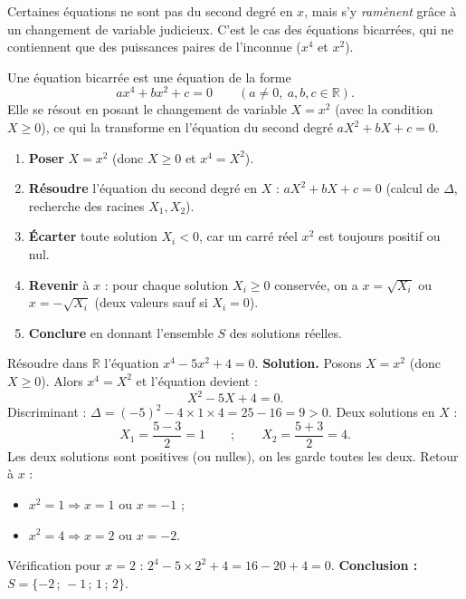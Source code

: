 \documentclass[11pt]{article}
\newcommand{\cle}[1]{{\popxbold\color{popdark}#1}}
\newcounter{popsec}
\newcounter{popsub}
\newcommand{\courssub}[1]{%
  \stepcounter{popsub}%
  \par\vspace{9pt}\noindent{\popxbold\fontsize{11.5}{13}\selectfont\color{popink}{\color{poporange}\thepopsec.\thepopsub}\hspace{6pt}#1}\par\nopagebreak\vspace{4pt}
}
\begin{document}
\courssub{Équations bicarrées}

Certaines équations ne sont pas du second degré en $x$, mais s'y \emph{ramènent} grâce à un changement de variable judicieux. C'est le cas des équations \cle{bicarrées}, qui ne contiennent que des puissances paires de l'inconnue ($x^4$ et $x^2$).

\begin{definition}
Une équation \cle{bicarrée} est une équation de la forme
\[ ax^4+bx^2+c=0 \qquad (a\neq 0,\ a,b,c\in\mathbb{R}). \]
Elle se résout en posant le changement de variable $X=x^2$ (avec la condition $X\geq 0$), ce qui la transforme en l'équation du second degré $aX^2+bX+c=0$.
\end{definition}

\begin{methode}
\begin{enumerate}
\item \textbf{Poser} $X=x^2$ (donc $X\geq 0$ et $x^4=X^2$).
\item \textbf{Résoudre} l'équation du second degré en $X$ : $aX^2+bX+c=0$ (calcul de $\Delta$, recherche des racines $X_1, X_2$).
\item \textbf{Écarter} toute solution $X_i < 0$, car un carré réel $x^2$ est toujours positif ou nul.
\item \textbf{Revenir} à $x$ : pour chaque solution $X_i \geq 0$ conservée, on a $x=\sqrt{X_i}$ ou $x=-\sqrt{X_i}$ (deux valeurs sauf si $X_i=0$).
\item \textbf{Conclure} en donnant l'ensemble $S$ des solutions réelles.
\end{enumerate}
\end{methode}

\begin{exoresolu}[Résoudre $x^4-5x^2+4=0$]
Résoudre dans $\mathbb{R}$ l'équation $x^4-5x^2+4=0$.
\tcblower
\textbf{Solution.}
Posons $X=x^2$ (donc $X\geq 0$). Alors $x^4=X^2$ et l'équation devient :
\[ X^2-5X+4=0. \]
Discriminant : $\Delta=(-5)^2-4\times 1\times 4=25-16=9>0$.
Deux solutions en $X$ :
\[ X_1=\frac{5-3}{2}=1 \qquad ; \qquad X_2=\frac{5+3}{2}=4. \]
Les deux solutions sont positives (ou nulles), on les garde toutes les deux. Retour à $x$ :
\begin{itemize}
\item $x^2=1 \Rightarrow x=1$ ou $x=-1$ ;
\item $x^2=4 \Rightarrow x=2$ ou $x=-2$.
\end{itemize}
Vérification pour $x=2$ : $2^4-5\times2^2+4=16-20+4=0$.
\textbf{Conclusion :} $S=\{-2\,;\,-1\,;\,1\,;\,2\}$.
\end{exoresolu}
\end{document}
